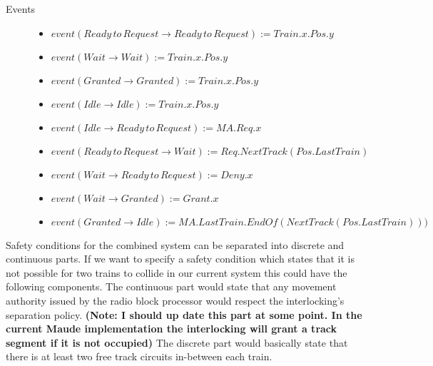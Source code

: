 \begin{mydef}
\begin{description}
\item[Events] \hspace*{0mm}
\begin{itemize}
\item $event(Ready \, to \, Request \to Ready \, to \, Request) := Train.x.Pos.y$
	\item $event(Wait \to Wait) := Train.x.Pos.y$
	\item $event(Granted \to Granted) := Train.x.Pos.y $
         \item $event(Idle \to Idle) := Train.x.Pos.y$
	\item $event(Idle \to Ready \, to \, Request) := MA.Req.x $
	\item $event(Ready \, to \, Request \to Wait) := Req.NextTrack(Pos.LastTrain)$
	\item $event(Wait \to Ready \, to \, Request) := Deny.x$
	\item $event(Wait \to Granted) := Grant.x$
	\item $event(Granted \to Idle) := MA.LastTrain.EndOf(NextTrack(Pos.LastTrain)))$
\end{itemize}

\end{description}

\end{mydef}


Safety conditions for the combined system can be separated into discrete and continuous parts.  If we want to specify a safety condition which states that it is not possible for two trains to collide in our current system this could have the following components. The continuous part would state that any movement authority issued by the radio block processor would respect the interlocking's separation policy. \textbf{(Note: I should up date this part at some point. In the current Maude implementation the interlocking will grant a track segment if it is not occupied)} The discrete part would basically state that there is at least two free track circuits in-between each train.

\FloatBarrier

